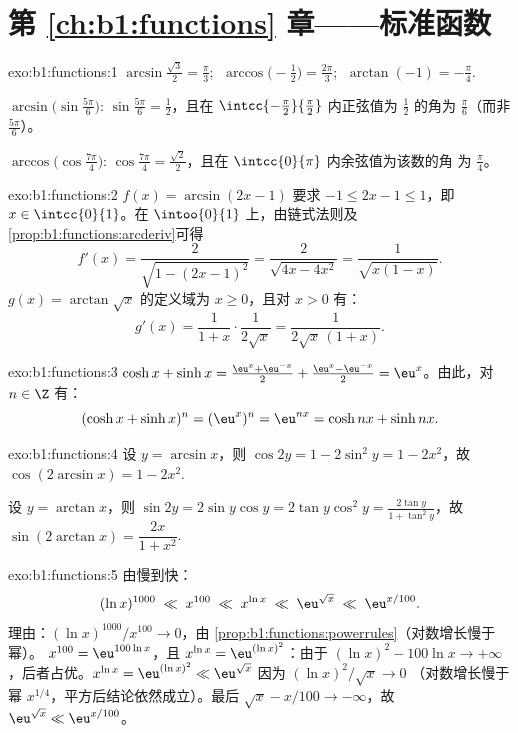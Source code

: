 \section*{第 \ref{ch:b1:functions} 章——标准函数}

\begin{solution}{exo:b1:functions:1}
$\arcsin\frac{\sqrt 3}{2} = \frac\pi3$;
$\;\arccos\bigl(-\frac12\bigr) = \frac{2\pi}{3}$;
$\;\arctan(-1) = -\frac\pi4$.

$\arcsin\bigl(\sin\frac{5\pi}{6}\bigr)$: $\sin\frac{5\pi}{6} =
\frac12$，且在 $\intcc{-\frac\pi2}{\frac\pi2}$ 内正弦值为
$\frac12$ 的角为 $\frac\pi6$（而非 $\frac{5\pi}{6}$）。

$\arccos\bigl(\cos\frac{7\pi}{4}\bigr)$: $\cos\frac{7\pi}{4} =
\frac{\sqrt 2}{2}$，且在 $\intcc{0}{\pi}$ 内余弦值为该数的角
为 $\frac\pi4$。
\end{solution}

\begin{solution}{exo:b1:functions:2}
$f(x) = \arcsin(2x - 1)$ 要求 $-1 \leq 2x - 1 \leq 1$，即 $x
\in \intcc{0}{1}$。在 $\intoo{0}{1}$ 上，由链式法则及
\cref{prop:b1:functions:arcderiv}可得
\[
f'(x) = \frac{2}{\sqrt{1 - (2x-1)^2}} = \frac{2}{\sqrt{4x - 4x^2}}
= \frac{1}{\sqrt{x(1 - x)}} .
\]
$g(x) = \arctan\sqrt x$ 的定义域为 $x \geq 0$，且对 $x > 0$ 有：
\[
g'(x) = \frac{1}{1 + x} \cdot \frac{1}{2\sqrt x}
= \frac{1}{2\sqrt x\,(1 + x)} .
\]
\end{solution}

\begin{solution}{exo:b1:functions:3}
$\cosh x + \sinh x = \frac{\eu^x + \eu^{-x}}{2} + \frac{\eu^x -
\eu^{-x}}{2} = \eu^x$。由此，对 $n \in \Z$ 有：
\[
(\cosh x + \sinh x)^n = (\eu^x)^n = \eu^{nx}
= \cosh nx + \sinh nx .
\]
\end{solution}

\begin{solution}{exo:b1:functions:4}
设 $y = \arcsin x$，则 $\cos 2y = 1 - 2\sin^2 y = 1 - 2x^2$，故
$\cos(2\arcsin x) = 1 - 2x^2$.

设 $y = \arctan x$，则 $\sin 2y = 2 \sin y \cos y = 2 \tan y \cos^2 y =
\frac{2\tan y}{1 + \tan^2 y}$，故 $\sin(2\arctan x) =
\dfrac{2x}{1 + x^2}$.
\end{solution}

\begin{solution}{exo:b1:functions:5}
由慢到快：
\[
(\ln x)^{1000} \;\ll\; x^{100} \;\ll\; x^{\ln x} \;\ll\;
\eu^{\sqrt x} \;\ll\; \eu^{x/100} .
\]
理由：$(\ln x)^{1000}/x^{100} \to 0$，由
\cref{prop:b1:functions:powerrules}（对数增长慢于幂）。
$x^{100} = \eu^{100\ln x}$，且 $x^{\ln x} = \eu^{(\ln x)^2}$：由于
$(\ln x)^2 - 100\ln x \to +\infty$，后者占优。$x^{\ln x} =
\eu^{(\ln x)^2} \ll \eu^{\sqrt x}$ 因为 $(\ln x)^2/\sqrt x \to 0$
（对数增长慢于幂 $x^{1/4}$，平方后结论依然成立）。最后 $\sqrt x - x/100
\to -\infty$，故 $\eu^{\sqrt x} \ll \eu^{x/100}$。
\end{solution}

